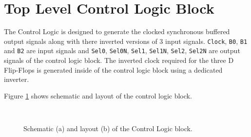 \documentclass[parskip,oneside,colorbacktitle,10pt,accentcolor=tud1b,table]{tudreport}
\begin{document}
{\clearpage
\section{Top Level Control Logic Block}

The Control Logic is designed to generate the clocked synchronous buffered output signals along with there inverted versions of 3 input signals. \texttt{Clock}, \texttt{B0}, \texttt{B1} and \texttt{B2} are input signals and \texttt{Sel0}, \texttt{Sel0N}, \texttt{Sel1}, \texttt{Sel1N}, \texttt{Sel2}, \texttt{Sel2N} are output signals of the control logic block. The inverted clock required for the three D Flip-Flops is generated inside of the control logic block using a dedicated inverter.

Figure \ref{fig:ctrl_top} shows schematic and layout of the control logic block.

\begin{figure}[H]
     \begin{center}
        \\
        \caption{Schematic (a) and layout (b) of the Control Logic block.}
        \label{fig:ctrl_top}
    \end{center}
\end{figure}


}
\end{document}
